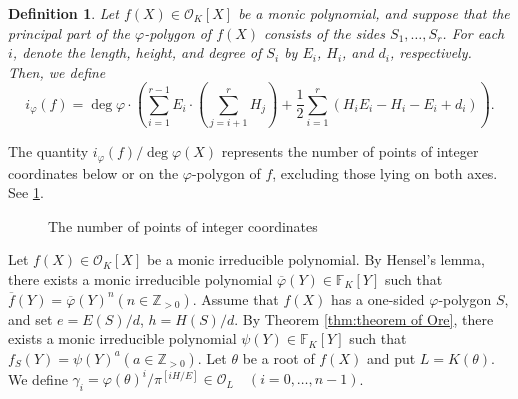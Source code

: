 \documentclass[10pt,a4paper]{amsart}
\newcommand{\field}[1]{\mathbb{#1}}
\newcommand{\Z}{\field{Z}}
\newtheorem{definition}[theorem]{Definition}
\numberwithin{equation}{section}
\begin{document}
    \begin{definition}\label{def:index of phi}
      Let $f(X) \in \mathcal{O}_K[X]$ be a monic polynomial, and suppose that the principal part 
      of the $\varphi$-polygon of $f(X)$ consists of the sides $S_1, \dots ,S_r$. 
      For each $i$, denote the length, height, and degree of $S_{i}$ by $E_i$, $H_i$, and $d_i$, respectively. 
      Then, we define 
      \[
        i_{\varphi}(f) = \deg\varphi\cdot\left(\sum_{i = 1}^{r - 1} E_i \cdot 
        \left(\sum_{j = i + 1}^r H_j\right) + \frac{1}{2} \sum_{i = 1}^r 
        (H_i E_i - H_i - E_i + d_i)\right).
      \]
    \end{definition}

    The quantity $i_{\varphi}(f)/\deg\varphi(X)$ represents the number of points of 
    integer coordinates below or on the $\varphi$-polygon of $f$, excluding those lying on both axes. 
    See \cref{fig:1}.

    \begin{figure}
      \centering
      \caption{The number of points of integer coordinates}
      \label{fig:1}
    \end{figure}

    Let $f(X) \in \mathcal{O}_K[X]$ be a monic irreducible polynomial. 
    By Hensel's lemma, there exists a monic irreducible polynomial $\overline{\varphi}(Y) \in \field{F}_K[Y]$ 
    such that $\overline{f}(Y) = \overline{\varphi}(Y)^n (n \in \Z_{> 0})$. 
    Assume that $f(X)$ has a one-sided $\varphi$-polygon $S$, and set $e=E(S)/d$, $h=H(S)/d$. 
    By Theorem \ref{thm:theorem of Ore}, there exists a monic irreducible polynomial $\psi(Y) \in \field{F}_K[Y]$ 
    such that $f_S(Y) = \psi(Y)^a (a \in \Z_{> 0})$. Let $\theta$ be a root of $f(X)$ and put $L=K(\theta)$. 
    We define $\gamma_i=\varphi(\theta)^i/\pi^{[iH/E]} \in \mathcal{O}_L \quad (i = 0, \dots ,n - 1)$. 
\end{document}
